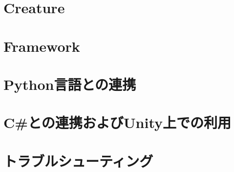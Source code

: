 \chapter{Creature}
\label{chap_creature}


\chapter{Framework}
\label{chap_framework}


\chapter{Python\KLUDGE 言語との連携}
\label{chap_embpython}


\chapter{C\#\KLUDGE との連携およびUnity\KLUDGE 上での利用}
\label{chap_unity}


\chapter{\KLUDGE トラブルシューティング}
\label{chap_trouble}

